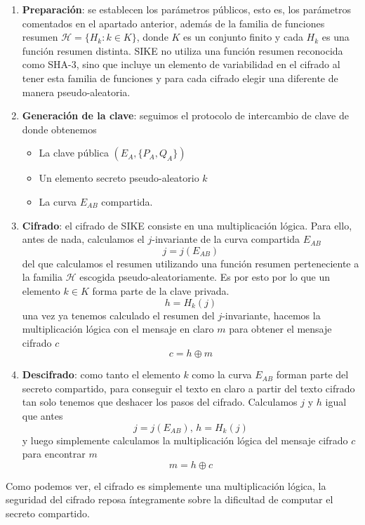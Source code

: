 \begin{enumerate}
    \item \textbf{Preparación}: se establecen los parámetros públicos, esto es, los parámetros comentados en el apartado anterior, además de la familia de funciones resumen $\mathcal{H} = \{ H_k : k \in K \}$, donde $K$ es un conjunto finito y cada $H_k$ es una función resumen distinta. SIKE no utiliza una función resumen reconocida como SHA-3, sino que incluye un elemento de variabilidad en el cifrado al tener esta familia de funciones y para cada cifrado elegir una diferente de manera pseudo-aleatoria.
    
    \item \textbf{Generación de la clave}: seguimos el protocolo de intercambio de clave de donde obtenemos
    \begin{itemize}
        \item La clave pública $(E_A, \{ P_A, Q_A \})$
        \item Un elemento secreto pseudo-aleatorio $k$
        \item La curva $E_{AB}$ compartida.
    \end{itemize}

    \item \textbf{Cifrado}: el cifrado de SIKE consiste en una multiplicación lógica. Para ello, antes de nada, calculamos el $j$-invariante de la curva compartida $E_{AB}$
        \[ j = j(E_{AB}) \]
    del que calculamos el resumen utilizando una función resumen perteneciente a la familia $\mathcal H$ escogida pseudo-aleatoriamente. Es por esto por lo que un elemento $k \in K$ forma parte de la clave privada. 
        \[ h = H_k(j) \]
    una vez ya tenemos calculado el resumen del $j$-invariante, hacemos la multiplicación lógica con el mensaje en claro $m$ para obtener el mensaje cifrado $c$
        \[ c = h \oplus m \]

    \item \textbf{Descifrado}: como tanto el elemento $k$ como la curva $E_{AB}$ forman parte del secreto compartido, para conseguir el texto en claro a partir del texto cifrado tan solo tenemos que deshacer los pasos del cifrado. Calculamos $j$ y $h$ igual que antes
        \[ j = j(E_{AB}), \, h = H_k(j) \]
    y luego simplemente calculamos la multiplicación lógica del mensaje cifrado $c$ para encontrar $m$
        \[ m = h \oplus c \]
\end{enumerate}

Como podemos ver, el cifrado es simplemente una multiplicación lógica, la seguridad del cifrado reposa íntegramente sobre la dificultad de computar el secreto compartido.

